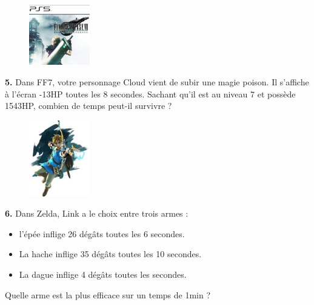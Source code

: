 \Pointilles[7]

\begin{minipage}[t]{0.25\textwidth}
  \begin{figure}[H]
    \centering
    \includegraphics[width=100px]{4x1-nombres-relatifs/ex2.jpg}
  \end{figure}
\end{minipage}
\begin{minipage}[t]{0.75\textwidth}
  \textbf{5.} Dans FF7, votre personnage Cloud vient de subir une magie poison. Il s'affiche à l'écran -13HP toutes les 8 secondes. Sachant qu'il est au niveau 7 et possède 1543HP, combien de temps peut-il survivre ?\\
  \Pointilles[6]
\end{minipage}

\Pointilles[3]

\begin{minipage}[t]{0.25\textwidth}
  \begin{figure}[H]
    \centering
    \includegraphics[width=100px]{4x1-nombres-relatifs/ex3.jpg}
  \end{figure}
\end{minipage}
\begin{minipage}[t]{0.75\textwidth}
  \textbf{6.} Dans Zelda, Link a le choix entre trois armes : 
  \begin{itemize}
    \item l'épée inflige 26 dégâts toutes les 6 secondes.
    \item La hache inflige 35 dégâts toutes les 10 secondes.
    \item La dague inflige 4 dégâts toutes les secondes.
  \end{itemize}
  Quelle arme est la plus efficace sur un temps de 1min ?\\
  \Pointilles[5]
\end{minipage}

\Pointilles[3]


